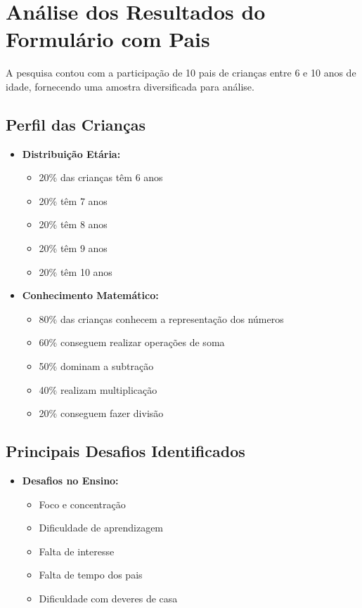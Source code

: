 \section{Análise dos Resultados do Formulário com Pais}

A pesquisa contou com a participação de 10 pais de crianças entre 6 e 10 anos de idade, fornecendo uma amostra diversificada para análise.

\subsection{Perfil das Crianças}

\begin{itemize}
    \item \textbf{Distribuição Etária:}
    \begin{itemize}
        \item 20\% das crianças têm 6 anos
        \item 20\% têm 7 anos
        \item 20\% têm 8 anos
        \item 20\% têm 9 anos
        \item 20\% têm 10 anos
    \end{itemize}
    
    \item \textbf{Conhecimento Matemático:}
    \begin{itemize}
        \item 80\% das crianças conhecem a representação dos números
        \item 60\% conseguem realizar operações de soma
        \item 50\% dominam a subtração
        \item 40\% realizam multiplicação
        \item 20\% conseguem fazer divisão
    \end{itemize}
\end{itemize}

\subsection{Principais Desafios Identificados}

\begin{itemize}
    \item \textbf{Desafios no Ensino:}
    \begin{itemize}
        \item Foco e concentração
        \item Dificuldade de aprendizagem
        \item Falta de interesse
        \item Falta de tempo dos pais
        \item Dificuldade com deveres de casa
    \end{itemize}
\end{itemize}

